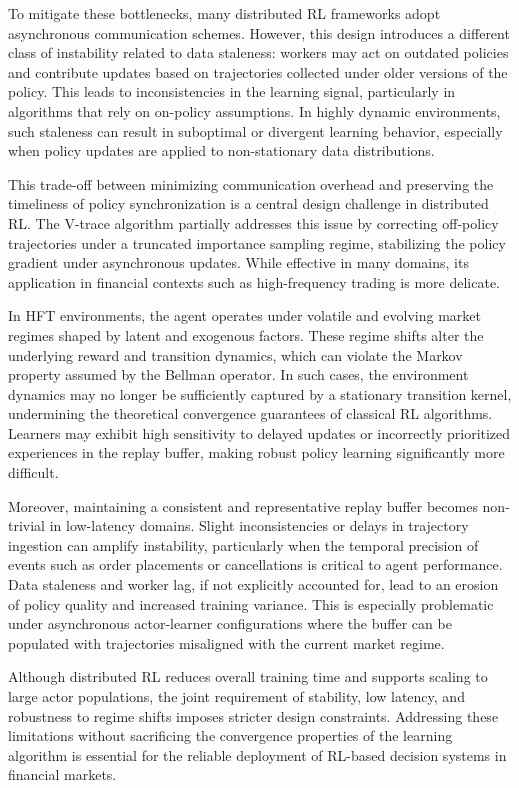 To mitigate these bottlenecks, many distributed RL frameworks adopt asynchronous communication schemes.
However, this design introduces a different class of instability related to data staleness:
workers may act on outdated policies and contribute updates based on trajectories collected under older versions of the policy.
This leads to inconsistencies in the learning signal, particularly in algorithms that rely on on-policy assumptions.
In highly dynamic environments, such staleness can result in suboptimal or divergent learning behavior, especially when policy updates are applied to non-stationary data distributions.

This trade-off between minimizing communication overhead and preserving the timeliness of policy synchronization is a central design challenge in distributed RL.
The V-trace algorithm partially addresses this issue by correcting off-policy trajectories under a truncated importance sampling regime,
stabilizing the policy gradient under asynchronous updates.
While effective in many domains, its application in financial contexts such as high-frequency trading is more delicate.

In HFT environments, the agent operates under volatile and evolving market regimes shaped by latent and exogenous factors.
These regime shifts alter the underlying reward and transition dynamics, which can violate the Markov property assumed by the Bellman operator.
In such cases, the environment dynamics may no longer be sufficiently captured by a stationary transition kernel,
undermining the theoretical convergence guarantees of classical RL algorithms.
Learners may exhibit high sensitivity to delayed updates or incorrectly prioritized experiences in the replay buffer, making robust policy learning significantly more difficult.

Moreover, maintaining a consistent and representative replay buffer becomes non-trivial in low-latency domains.
Slight inconsistencies or delays in trajectory ingestion can amplify instability,
particularly when the temporal precision of events such as order placements or cancellations is critical to agent performance.
Data staleness and worker lag, if not explicitly accounted for, lead to an erosion of policy quality and increased training variance.
This is especially problematic under asynchronous actor-learner configurations where the buffer can be populated with trajectories misaligned with the current market regime.

Although distributed RL reduces overall training time and supports scaling to large actor populations,
the joint requirement of stability, low latency, and robustness to regime shifts imposes stricter design constraints.
Addressing these limitations without sacrificing the convergence properties of the learning algorithm is essential
for the reliable deployment of RL-based decision systems in financial markets.

